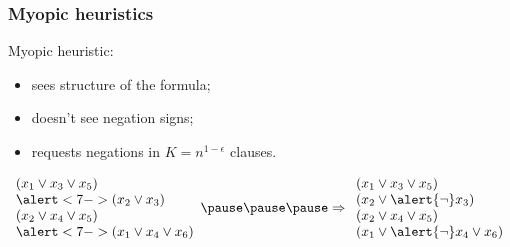 \begin{frame}
	\frametitle{Myopic heuristics}
    \pause

    \begin{definition}
        Myopic heuristic:
        \pause
        \begin{itemize}
	        \item sees structure of the formula;
        	\pause
        	\item doesn't see negation signs;
        	\item<6-> requests negations in $K = n^{1 - \epsilon}$ clauses.
        \end{itemize}
    \end{definition}

    \pause
    $\begin{array}{l}
        (x_1 \vee x_3 \vee x_5) \\
        \alert<7->{(x_2 \vee x_3)} \\
        (x_2 \vee x_4 \vee x_5) \\
        \alert<7->{(x_1 \vee x_4 \vee x_6)} \\
    \end{array}
    \pause
    \pause
    \pause
    \Rightarrow
    \begin{array}{l}
        (x_1 \vee x_3 \vee x_5) \\
        (x_2 \vee \alert{\neg} x_3) \\
        (x_2 \vee x_4 \vee x_5) \\
        (x_1 \vee \alert{\neg} x_4 \vee x_6) \\
    \end{array}$
    
\end{frame}

